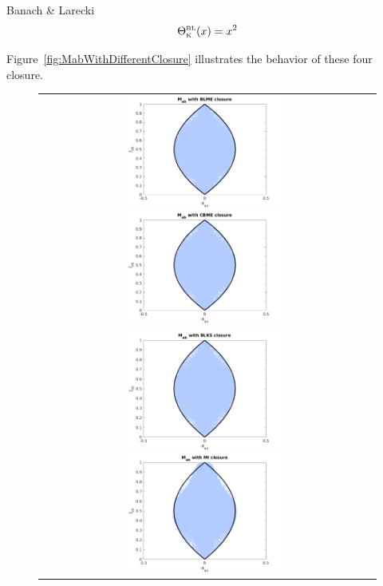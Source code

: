 Banach \& Larecki \cite{banachLarecki_2017a}
\begin{equation}
  \Theta_{\mbox{\tiny K}}^{\mbox{\tiny BL}}(x)=x^{2}
\end{equation}

Figure~\ref{fig:MabWithDifferentClosure} illustrates the behavior of these four closure.
\begin{figure}[h]
  \centering
  \begin{tabular}{cc}
    \includegraphics[width=0.5\textwidth]{figures/MabWithBLME}
    \includegraphics[width=0.5\textwidth]{figures/MabWithCBME} \\
    \includegraphics[width=0.5\textwidth]{figures/MabWithBLKS}
    \includegraphics[width=0.5\textwidth]{figures/MabWithMI}

\end{tabular}
\end{figure}
